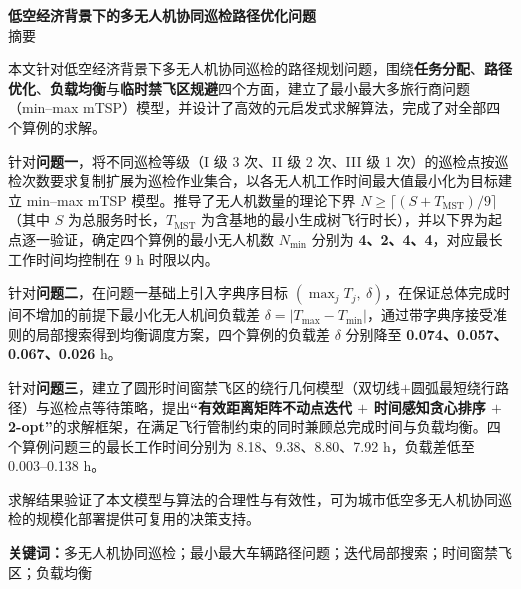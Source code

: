 \documentclass[12pt,a4paper]{ctexart}
\begin{document}
\pagestyle{front}
\thispagestyle{front}

\begin{center}
  {\bfseries 低空经济背景下的多无人机协同巡检路径优化问题}\\[6pt]
  { 摘\quad 要}
\end{center}

\noindent
本文针对低空经济背景下多无人机协同巡检的路径规划问题，围绕\textbf{任务分配}、\textbf{路径优化}、\textbf{负载均衡}与\textbf{临时禁飞区规避}四个方面，建立了最小最大多旅行商问题（min--max mTSP）模型，并设计了高效的元启发式求解算法，完成了对全部四个算例的求解。

针对\textbf{问题一}，将不同巡检等级（I 级 3 次、II 级 2 次、III 级 1 次）的巡检点按巡检次数要求复制扩展为巡检作业集合，以各无人机工作时间最大值最小化为目标建立 min--max mTSP 模型。推导了无人机数量的理论下界
$N\ge \lceil (S+T_{\mathrm{MST}})/9\rceil$
（其中 $S$ 为总服务时长，$T_{\mathrm{MST}}$ 为含基地的最小生成树飞行时长），并以下界为起点逐一验证，确定四个算例的最小无人机数 $N_{\min}$ 分别为 \textbf{4、2、4、4}，对应最长工作时间均控制在 9 h 时限以内。

针对\textbf{问题二}，在问题一基础上引入字典序目标 $(\max_j T_j,\ \delta)$，在保证总体完成时间不增加的前提下最小化无人机间负载差 $\delta=|T_{\max}-T_{\min}|$，通过带字典序接受准则的局部搜索得到均衡调度方案，四个算例的负载差 $\delta$ 分别降至 \textbf{0.074、0.057、0.067、0.026} h。

针对\textbf{问题三}，建立了圆形时间窗禁飞区的绕行几何模型（双切线$+$圆弧最短绕行路径）与巡检点等待策略，提出\textbf{``有效距离矩阵不动点迭代 $+$ 时间感知贪心排序 $+$ 2-opt''}的求解框架，在满足飞行管制约束的同时兼顾总完成时间与负载均衡。四个算例问题三的最长工作时间分别为 8.18、9.38、8.80、7.92 h，负载差低至 0.003--0.138 h。

求解结果验证了本文模型与算法的合理性与有效性，可为城市低空多无人机协同巡检的规模化部署提供可复用的决策支持。

\vspace{8pt}
\noindent\textbf{关键词：}多无人机协同巡检；最小最大车辆路径问题；迭代局部搜索；时间窗禁飞区；负载均衡

\clearpage

\pagestyle{front}
\thispagestyle{front}
\setcounter{tocdepth}{1}
\tableofcontents
\thispagestyle{front}
\clearpage
\end{document}
